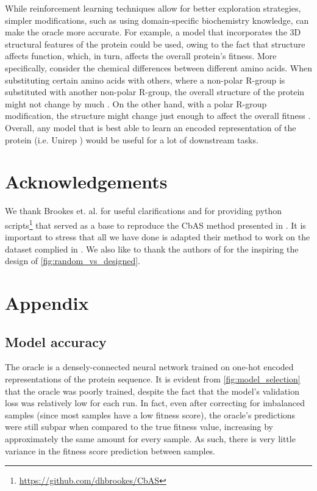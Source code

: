\documentclass{article}
\begin{document}
While reinforcement learning techniques allow for better exploration strategies,
simpler modifications, such as using domain-specific biochemistry knowledge, can
make the oracle more accurate. For example, a model that incorporates the 3D
structural features of the protein \cite{cho2018three} could be used, owing to
the fact that structure affects function, which, in turn, affects the overall
protein's fitness. More specifically, consider the chemical differences between
different amino acids. When substituting certain amino acids with others, where
a non-polar R-group is substituted with another non-polar R-group, the overall
structure of the protein might not change by much \cite{betts2003amino,
loladze2002thermodynamic}. On the other hand, with a polar R-group modification,
the structure might change just enough to affect the overall fitness
\cite{alvares2013effects}. Overall, any model that is best able to learn an
encoded representation of the protein (i.e. Unirep \cite{alley2019unified})
would be useful for a lot of downstream tasks.


\section{Acknowledgements}
We thank Brookes et. al. for useful clarifications and for providing python
scripts\footnote{\url{https://github.com/dhbrookes/CbAS}} that served as a base
to reproduce the CbAS method presented in \cite{brookes2019conditioning}. It is
important to stress that all we have done is adapted their method to work on the
dataset complied in \cite{wu2016adaptation}. We also like to thank the authors
of \cite{ogden2019comprehensive} for the inspiring the design of
\cref{fig:random_vs_designed}.





\newpage
\appendix

\section{Appendix}

\subsection{Model accuracy}
\label{sec:appendix-model_accuracy}
The oracle is a densely-connected neural network trained on one-hot encoded
representations of the protein sequence. It is evident from
\cref{fig:model_selection} that the oracle was poorly trained, despite the fact
that the model's validation loss was relatively low for each run. In fact, even
after correcting for imbalanced samples (since most samples have a low fitness
score), the oracle's predictions were still subpar when compared to the true
fitness value, increasing by approximately the same amount for every sample. As
such, there is very little variance in the fitness score prediction between
samples.
\end{document}
